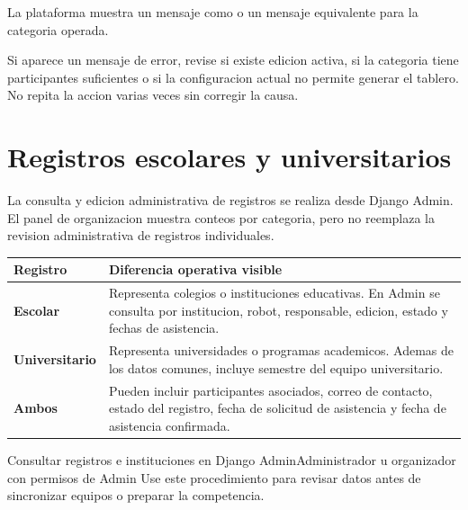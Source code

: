 \begin{resultadoesperado}
La plataforma muestra un mensaje como  o un mensaje equivalente para la categoria operada.
\end{resultadoesperado}

\begin{fallas}
Si aparece un mensaje de error, revise si existe edicion activa, si la categoria tiene participantes suficientes o si la configuracion actual no permite generar el tablero. No repita la accion varias veces sin corregir la causa.
\end{fallas}

\section{Registros escolares y universitarios}

La consulta y edicion administrativa de registros se realiza desde Django Admin. El panel de organizacion muestra conteos por categoria, pero no reemplaza la revision administrativa de registros individuales.

\begin{tabularx}{\linewidth}{>{\bfseries}p{4cm}X}
\toprule
Registro & Diferencia operativa visible\\
\midrule
Escolar & Representa colegios o instituciones educativas. En Admin se consulta por institucion, robot, responsable, edicion, estado y fechas de asistencia.\\
Universitario & Representa universidades o programas academicos. Ademas de los datos comunes, incluye semestre del equipo universitario.\\
Ambos & Pueden incluir participantes asociados, correo de contacto, estado del registro, fecha de solicitud de asistencia y fecha de asistencia confirmada.\\
\bottomrule
\end{tabularx}

\begin{procedimiento}{Consultar registros e instituciones en Django Admin}{Administrador u organizador con permisos de Admin}
Use este procedimiento para revisar datos antes de sincronizar equipos o preparar la competencia.
\end{procedimiento}


